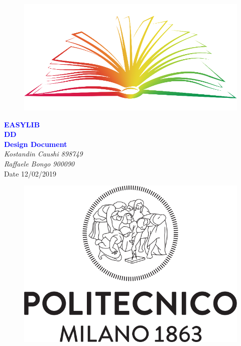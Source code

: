 


	\begin{titlepage}
		\centering
		\begin{figure}
			\vspace*{0mm}
			\centering
			\includegraphics[scale=0.3]{Images/EasyLib_Logo}
			\\[2cm]
		\end{figure}
		\vspace{5mm}
		\textcolor{Blue}{\textbf{\huge EASYLIB}}\\[15mm]
		\textcolor{Blue}{\textbf{\huge DD}}\\[4mm]
		{\textcolor{Blue}{\textbf{\Large{Design Document}}}}\\
		\vspace{30mm}
		\textit{\large Kostandin Caushi 898749}\\[3mm]
		\textit{\large Raffaele Bongo 900090}\\[3mm]
		\vspace*{30mm}
		Date 12/02/2019\\[1cm]
		\begin{figure}[h]
			\begin{flushright}
				\includegraphics[scale=0.13]{Images/Polimi_Logo}
			\end{flushright}
		\end{figure}
	\end{titlepage}

